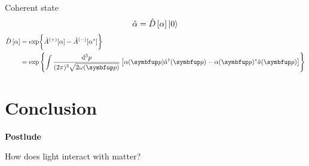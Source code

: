 \documentclass[aspectratio=169,usenames,dvipsnames]{beamer}
\begin{document}
	\begin{frame}{Coherent state}
		\begin{equation}
			\hat{\alpha}
			=
			\hat{D}\left[\alpha\right]
			\lvert0\rangle
		\end{equation}
		\begin{equation}
			\begin{split}
				\hat{D}\left[\alpha\right]
				&=
				\exp\biggl\{
					\hat{A}^{(+)}[\alpha]
					-
					\hat{A}^{(-)}[\alpha^*]
				\biggr\}
				\\
				&=
				\exp\left\{
					\int\frac{\dd[3]{p}}{(2\pi)^3\sqrt{2\omega(\vb{p})}}
					\left[
						\alpha(\vb{p})
						\hat{a}^\dagger(\vb{p})
						-
						\alpha(\vb{p})^*
						\hat{a}(\vb{p})
					\right]
				\right\}
			\end{split}
		\end{equation}
	\end{frame}
	
	\section{Conclusion}
	
	\begin{frame}
		\begin{center}
			\textbf{Postlude}
			
			How does light interact with matter?
		\end{center}
	\end{frame}
	
	\appendix
	
\end{document}
